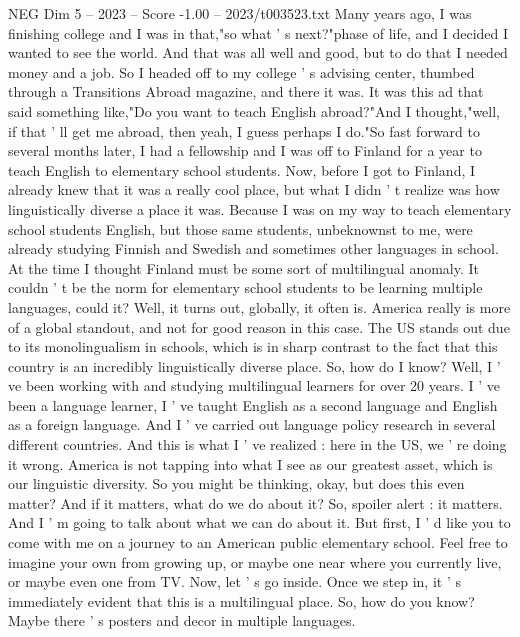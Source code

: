 \begin{textsample}{NEG Dim 5 – 2023 – Score -1.00 – 2023/t003523.txt}  \label{ex:f5_neg_012}
Many years ago, I was finishing college and I was in that,"so what ' s next?"phase of life, and I decided I wanted to see the world.
And that was all well and good, but to do that I needed money and a job.
So I headed off to my college ' s advising center, thumbed through a Transitions Abroad magazine, and there it was.
It was this ad that said something like,"Do you want to teach English abroad?"And I thought,"well, if that ' ll get me abroad, then yeah, I guess perhaps I do."So fast forward to several months later, I had a fellowship and I was off to Finland for a year to teach English to elementary school students.
Now, before I got to Finland, I already knew that it was a really cool place, but what I didn ' t realize was how linguistically diverse a place it was.
Because I was on my way to teach elementary school students English, but those same students, unbeknownst to me, were already studying Finnish and Swedish and sometimes other languages in school.
At the time I thought Finland must be some sort of multilingual anomaly.
It couldn ' t be the norm for elementary school students to be learning multiple languages, could it?
Well, it turns out, globally, it often is.
America really is more of a global standout, and not for good reason in this case.
The US stands out due to its monolingualism in schools, which is in sharp contrast to the fact that this country is an incredibly linguistically diverse place.
So, how do I know?
Well, I ' ve been working with and studying multilingual learners for over 20 years.
I ' ve been a language learner, I ' ve taught English as a second language and English as a foreign language.
And I ' ve carried out language policy research in several different countries.
And this is what I ' ve realized : here in the US, we ' re doing it wrong.
America is not tapping into what I see as our greatest asset, which is our linguistic diversity.
So you might be thinking, okay, but does this even matter?
And if it matters, what do we do about it?
So, spoiler alert : it matters.
And I ' m going to talk about what we can do about it.
But first, I ' d like you to come with me on a journey to an American public elementary school.
Feel free to imagine your own from growing up, or maybe one near where you currently live, or maybe even one from TV.
Now, let ' s go inside.
Once we step in, it ' s immediately evident that this is a multilingual place.
So, how do you know?
Maybe there ' s posters and decor in multiple languages.

\end{textsample}
